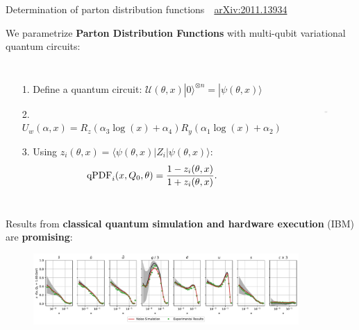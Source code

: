 \documentclass[8pt, xcolor={svgnames}, hyperref={linkcolor=black}]{beamer}
\begin{document}
\begin{frame}[fragile]{Determination of parton distribution functions \hfill \faBook\,\, \href{https://arxiv.org/abs/2011.13934}{arXiv:2011.13934}}

  \small
  We parametrize \textbf{Parton Distribution Functions} with multi-qubit variational quantum circuits:
  \begin{columns}
    \column{6cm}
    \begin{itemize}
      \item[1.] Define a quantum circuit: $\mathcal{U}(\theta, x) | 0 \rangle ^ {\otimes n} = | \psi (\theta, x) \rangle$
      \item[2.] $U_w (\alpha, x) = R_z(\alpha_3 \log(x) + \alpha_4) R_y(\alpha_1 \log(x) + \alpha_2)$
      \item[3.] Using $z_i (\theta, x) = \langle \psi (\theta, x) | Z_i | \psi (\theta, x) \rangle$:
      \begin{equation*}
        {\rm qPDF}_i (x, Q_0, \theta) = \frac{1-z_i (\theta, x)}{1+z_i(\theta, x)}.
      \end{equation*}
    \end{itemize}

    \column{4cm}
    \vspace{-0.2cm}
    \begin{figure}
      \includegraphics[height=3cm]{figures/layer.pdf}
    \end{figure}
  \end{columns}

  Results from \textbf{\color{teal} classical quantum simulation and hardware execution} (IBM) are \textbf{promising}:
  \begin{figure}
    \includegraphics[width=0.9\textwidth]{figures/Experiments-SingleFlavor.pdf}
  \end{figure}

\end{frame}
\end{document}
